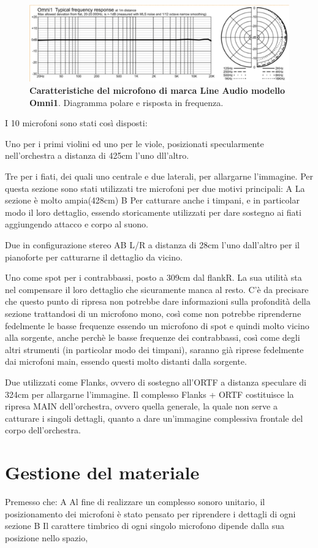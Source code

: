 \begin{figure}[b]
	\begin{center}
		\includegraphics[width=.47\textwidth]{img/image1.png}
		\caption{\textbf{Caratteristiche del microfono di marca Line Audio modello Omni1}. Diagramma polare e risposta in frequenza.}
		\label{gr01}
	\end{center}
\end{figure}

I 10 microfoni sono stati così disposti:

Uno per i primi violini ed uno per le viole, posizionati specularmente nell'orchestra a distanza di 425cm l'uno dll'altro.

Tre per i fiati, dei quali uno centrale e due laterali, per allargarne l'immagine. Per questa sezione sono stati utilizzati tre microfoni per due motivi principali:
A La sezione è molto ampia(428cm)
B Per catturare anche i timpani, e in particolar modo il loro dettaglio, essendo storicamente utilizzati per dare sostegno ai fiati aggiungendo attacco e corpo al  suono.

Due in configurazione stereo AB L/R a distanza di 28cm l'uno dall'altro per il pianoforte per catturarne il dettaglio da vicino.

Uno come spot per i contrabbassi, posto a 309cm dal flankR. La sua utilità sta nel compensare il loro dettaglio che sicuramente manca al resto. C'è da precisare che questo punto di ripresa non potrebbe dare informazioni sulla profondità della sezione trattandosi di un microfono mono, così come non potrebbe riprenderne fedelmente le basse frequenze essendo un microfono di spot e quindi molto vicino alla sorgente, anche perchè le basse frequenze dei contrabbassi, così come degli altri strumenti (in particolar modo dei timpani), saranno già riprese fedelmente dai microfoni main, essendo questi molto distanti dalla sorgente.

Due utilizzati come Flanks, ovvero di sostegno all'ORTF a distanza speculare di 324cm per allargarne l'immagine. Il complesso Flanks + ORTF costituisce la ripresa MAIN dell'orchestra, ovvero quella generale, la quale non serve a catturare i singoli dettagli, quanto a dare un'immagine complessiva frontale del corpo dell'orchestra.


\section*{Gestione del materiale}
Premesso che:
A Al fine di realizzare un complesso sonoro unitario, il posizionamento dei microfoni è stato pensato per riprendere i dettagli di ogni sezione
B Il carattere timbrico di ogni singolo microfono dipende dalla sua posizione nello spazio,

